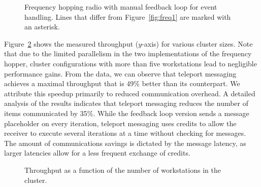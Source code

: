 \documentclass{sig-alternate}
\begin{document}
%
\begin{figure}[t]
\vspace{-12pt}
\hspace{-0.2in}
\vspace{-20pt}
\caption{\small Frequency hopping radio with manual feedback loop for
event handling.  Lines that differ from Figure~\ref{fig:freq1} are
marked with an asterisk. \protect\label{fig:freq2}}
\vspace{-12pt}
\end{figure}

\clearpage
\noindent
%

Figure~\ref{fig:fhr-throughput} shows the measured throughput
($y$-axis) for various cluster sizes.  Note that due to the limited
parallelism in the two implementations of the frequency hopper,
cluster configurations with more than five workstations lead to
negligible performance gains. From the data, we can observe that
teleport messaging achieves a maximal throughput that is 49\% better
than its counterpart.  We attribute this speedup primarily to reduced
communication overhead.  A detailed analysis of the results indicates
that teleport messaging reduces the number of items communicated by
35\%.  While the feedback loop version sends a message placeholder on
every iteration, teleport messaging uses credits to allow the receiver
to execute several iterations at a time without checking for messages.
The amount of communications savings is dictated by the message
latency, as larger latencies allow for a less frequent exchange of
credits.

\begin{figure}[t]
\vspace{-10pt}
\vspace{-20pt}
\caption{\small Throughput as a function of the number of workstations
in the cluster. 
\protect\label{fig:fhr-throughput}}
\vspace{-6pt}
\end{figure}

\end{document}

